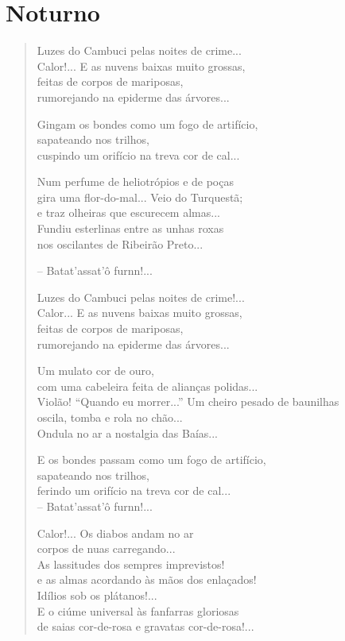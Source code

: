 \chapter{Noturno}

\begin{verse}
Luzes do Cambuci pelas noites de crime...\\
Calor!... E as nuvens baixas muito grossas,\\
feitas de corpos de mariposas,\\
rumorejando na epiderme das árvores...

Gingam os bondes como um fogo de artifício,\\
sapateando nos trilhos,\\
cuspindo um orifício na treva cor de cal...

Num perfume de heliotrópios e de poças\\
gira uma flor-do-mal... Veio do Turquestã;\\
e traz olheiras que escurecem almas...\\
Fundiu esterlinas entre as unhas roxas\\
nos oscilantes de Ribeirão Preto...

-- Batat'assat'ô furnn!...

Luzes do Cambuci pelas noites de crime!...\\
Calor... E as nuvens baixas muito grossas,\\
feitas de corpos de mariposas,\\
rumorejando na epiderme das árvores...

Um mulato cor de ouro,\\
com uma cabeleira feita de alianças polidas...\\
Violão! ``Quando eu morrer...'' Um cheiro pesado de baunilhas\\
oscila, tomba e rola no chão...\\
Ondula no ar a nostalgia das Baías...

E os bondes passam como um fogo de artifício,\\
sapateando nos trilhos,\\
ferindo um orifício na treva cor de cal...\\

-- Batat'assat'ô furnn!...

Calor!... Os diabos andam no ar\\
corpos de nuas carregando...\\
As lassitudes dos sempres imprevistos!\\
e as almas acordando às mãos dos enlaçados!\\
Idílios sob os plátanos!...\\
E o ciúme universal às fanfarras gloriosas\\
de saias cor-de-rosa e gravatas cor-de-rosa!...


\end{verse}
